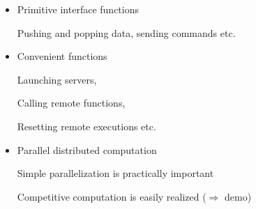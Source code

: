 \begin{slide}{}

\begin{itemize}
\item Primitive interface functions

Pushing and popping data, sending commands etc.

\item Convenient functions

Launching servers,

Calling remote functions,

Resetting remote executions etc.

\item Parallel distributed computation

Simple parallelization is practically important

Competitive computation is easily realized ($\Rightarrow$ demo)
\end{itemize}
\end{slide}


